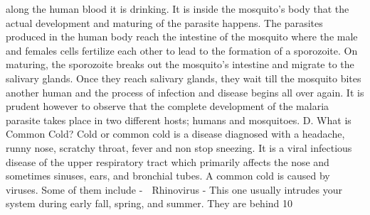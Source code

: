 along the human blood it is drinking. It is inside the mosquito’s body that the actual development and maturing of the parasite happens. The parasites produced in the human body reach the intestine of the mosquito where the male and females cells fertilize each other to lead to the formation of a sporozoite. On maturing, the sporozoite breaks out the mosquito’s intestine and migrate to the salivary glands. Once they reach salivary glands, they wait till the mosquito bites another human and the process of infection and disease begins all over again. It is prudent however to observe that the complete development of the malaria parasite takes place in two different hosts; humans and mosquitoes. D. What is Common Cold? Cold or common cold is a disease diagnosed with a headache, runny nose, scratchy throat, fever and non stop sneezing. It is a viral infectious disease of the upper respiratory tract which primarily affects the nose and sometimes sinuses, ears, and bronchial tubes. A common cold is caused by viruses. Some of them include -  Rhinovirus - This one usually intrudes your system during early fall, spring, and summer. They are behind 10%

